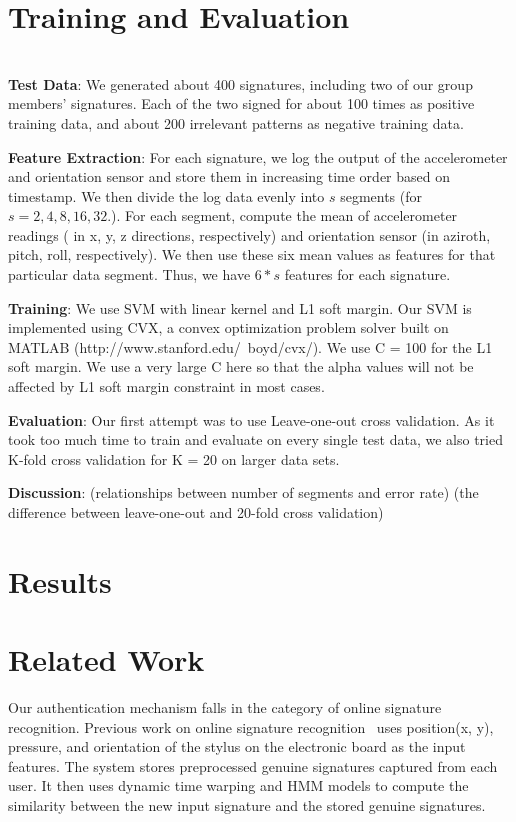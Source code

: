 \documentclass[12pt]{article}
\begin{document}
\section{Training and Evaluation}
\\
\textbf{Test Data}:
We generated about 400 signatures, including two of our group members' signatures. Each of the two signed for about 100 times as positive training data, and about 200 irrelevant patterns as negative training data.

\textbf{Feature Extraction}:
For each signature, we log the output of the accelerometer and orientation sensor and store them in increasing time order based on timestamp. We then divide the log data evenly into $s$ segments (for $s = 2,4,8,16,32$.). For each segment, compute the mean of accelerometer readings ( in x, y, z directions, respectively) and orientation sensor (in aziroth, pitch, roll, respectively). We then use these six mean values as features for that particular data segment. Thus, we have $6*s$ features for each signature.

\textbf{Training}:
We use SVM with linear kernel and L1 soft margin. Our SVM is implemented using CVX, a convex optimization problem solver built on MATLAB (http://www.stanford.edu/~boyd/cvx/). We use C = 100 for the L1 soft margin. We use a very large C here so that the alpha values will not be affected by L1 soft margin constraint in most cases.

\textbf{Evaluation}:
Our first attempt was to use Leave-one-out cross validation. As it took too much time to train and evaluate on every single test data, we also tried K-fold cross validation for K = 20 on larger data sets.

\textbf{Discussion}:
(relationships between number of segments and error rate)
(the difference between leave-one-out and 20-fold cross validation)

\section{Results}

\section{Related Work}

Our authentication mechanism falls in the category of online signature recognition. Previous work on online signature recognition~\cite{zanuy:2006} uses position(x, y), pressure, and orientation of the stylus on the electronic board as the input features. The system stores preprocessed genuine signatures captured from each user. It then uses dynamic time warping and HMM models to compute the similarity between the new input signature and the stored genuine signatures.
\end{document}
